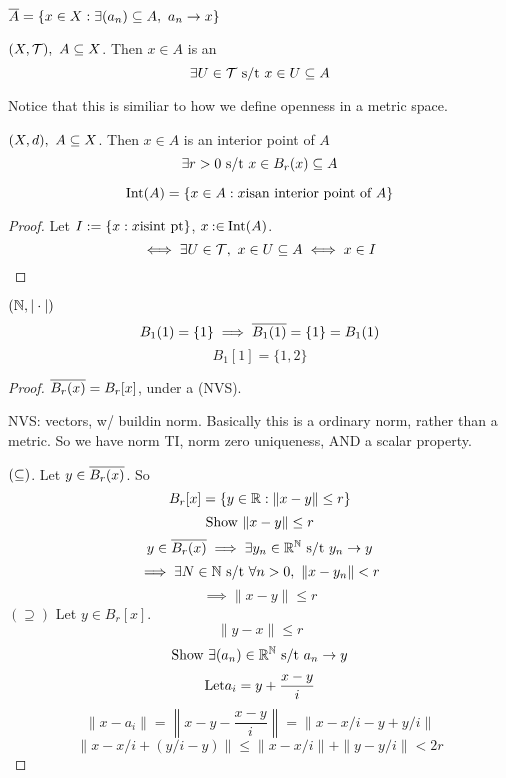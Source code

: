 \documentclass[12pt]{article}
\begin{document}
\bboxcoro
\begin{coro}
    \(\cls A=\{x\in X : \exists(a_n)\ssq A,\ a_n\to x\}\)
\end{coro}
\ebox

\bboxdefn
\begin{defn}
    \((X,\mathcal T),\ A\subseteq X\). Then \(x\in A\) is an 
    \[
        \exists U\in\mathcal T\text{ s/t } x\in U\subseteq A
    \]
    \bboxnote
    \begin{note}
        Notice that this is similiar to how we define openness in a metric 
        space.
    \end{note}
    \ebox
\end{defn}
\ebox

\bboxnote
\begin{note}
    \((X,d),\ A\subseteq X\). Then \(x\in A\) is an interior point of \(A\) 
    \[
        \exists r > 0 \text{ s/t } x \in B_r(x) \subseteq A
    \]
\end{note}
\ebox

\bboxprop
\begin{prop}
    \[
        \mathrm{Int}(A) = \{
            x \in A : x \mathrm{is} \text{an interior point of }A
        \}
    \]
\end{prop}
\ebox

\bboxproof
\begin{proof}
    Let \(I:=\{ x : x\mathrm{is}\text{int pt}\}\), \(x\mathbin{:\in}\mathrm{Int}(A)\).
    \[
        \iff\exists U\in\mathcal T,\ x\in U\subseteq A\iff x\in I
    \]
\end{proof}
\ebox

\bboxexam
\begin{exam}
    \((\mathbb N,|\cdot|)\)
    \[
        B_1(1) = \{1\}\implies \overline{B_1(1)}=\{1\}=B_1(1)
    \]
    \[
        B_1[1]=\{1,2\}
    \]
\end{exam}
\ebox

\bboxproof
\begin{proof}
     \(\overline{B_r(x)}=B_r[x]\), under a (NVS).

    NVS: vectors, w/ buildin norm. Basically this is a ordinary norm, 
    rather than a metric. So we have norm TI, norm zero uniqueness,
    AND a scalar property.

    \((\subseteq)\). Let \(y\in\overline{B_r(x)}\). So 
    \[
        B_r[x]=\{y\in\mathbb R : \|x-y\|\le r\}
    \]
    \[
        \text{Show }\|x-y\|\le r
    \]
    \[
        y\in\overline{B_r(x)}\implies\exists y_n\in\mathbb R^\mathbb N\text{ s/t } y_n\to y
    \]
    \[
        \implies\exists N\in\mathbb N\text{ s/t }\forall n>0,\
        \|x-y_n\|<r
    \]
    \[
        \implies \|x-y\|\le r
    \]
    \((\supseteq)\) Let \(y\in B_r[x]\).
    \[
        \|y-x\|\le r
    \]
    \[
        \text{Show }\exists(a_n)\in\mathbb R^\mathbb N\text{ s/t } a_n\to y
    \]
    \[
        \mathrm{Let} a_i=y+\frac{x-y}i
    \]
    \[
        \|x-a_i\|=\left\|x-y-\frac{x-y}i\right\|=\|x-x/i-y+y/i\|
    \]
    \[
        \|x-x/i+(y/i-y)\|\le\|x-x/i\|+\|y-y/i\|<2r
    \]
\end{proof}
\ebox
\end{document}
